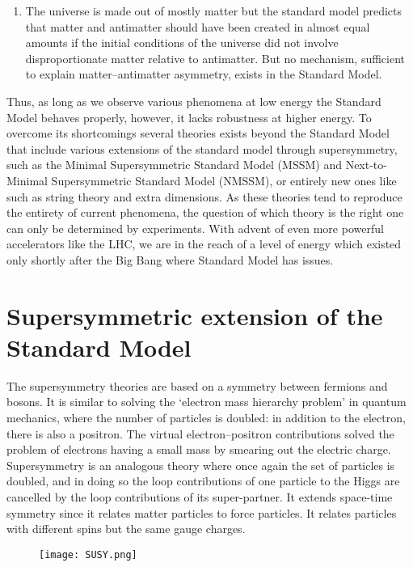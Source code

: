 \begin{enumerate}
	\item{The universe is made out of mostly matter but the standard model predicts that matter and antimatter should have been created in almost equal amounts if the initial conditions of the universe did not involve disproportionate matter relative to antimatter\cite{matterAntimatter}. But no mechanism, sufficient to explain matter--antimatter asymmetry, exists in the Standard Model.}
\end{enumerate}

Thus, as long as we observe various phenomena at low energy the Standard Model behaves properly, however, it lacks robustness at higher energy. To overcome its shortcomings several theories exists beyond the Standard Model that include various extensions of the standard model through supersymmetry, such as the Minimal Supersymmetric Standard Model (MSSM)\cite{MSSM,MSSM2} and Next-to-Minimal Supersymmetric Standard Model (NMSSM)\cite{NSSM1}, or entirely new ones like such as string theory\cite{StringTheory} and extra dimensions\cite{ExtraDimensions}. As these theories tend to reproduce the entirety of current phenomena, the question of which theory is the right one can only be determined by experiments. With advent of even more powerful accelerators like the LHC, we are in the reach of a level of energy which existed only shortly after the Big Bang where Standard Model has issues.

\section{Supersymmetric extension of the Standard Model}

The supersymmetry theories are based on a symmetry between fermions and bosons. It is similar to solving the `electron mass hierarchy problem' in quantum mechanics, where the number of particles is doubled: in addition to the electron, there is also a positron. The virtual electron--positron contributions solved the problem of electrons having a small mass by smearing out the electric charge. Supersymmetry is an analogous theory where once again the set of particles is doubled, and in doing so the loop contributions of one particle to the Higgs are cancelled by the loop contributions of its super-partner. It extends space-time symmetry since it relates matter particles to force particles. It relates particles with different spins but the same gauge charges.

\begin{figure}[H]
\begin{center}
\texttt{[image: SUSY.png]} 
\caption{}
\label{SUSY} 
\end{center}
\end{figure}


